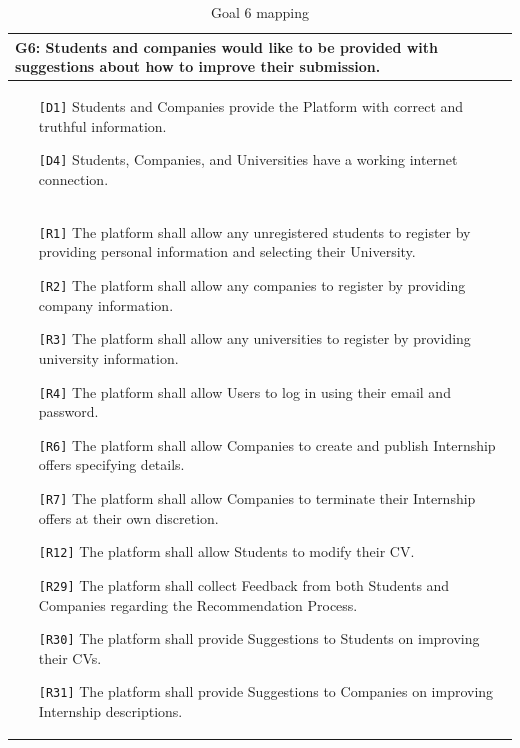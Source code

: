 \begin{table}[H]
    \centering
    \begin{tabular}{|p{15cm}|}
        \hline
        \textbf{G6:} Students and companies would like to be provided with suggestions about how to improve their submission. \\ \hline
        \begin{itemize}
            \item[\texttt{[D1]}] Students and Companies provide the Platform with correct and truthful information.
            \item[\texttt{[D4]}] Students, Companies, and Universities have a working internet connection.
        \end{itemize} \\ \hline
        \begin{itemize}
            \item[\texttt{[R1]}] The platform shall allow any unregistered students to register by providing personal information and selecting their University.
            \item[\texttt{[R2]}] The platform shall allow any companies to register by providing company information.
            \item[\texttt{[R3]}] The platform shall allow any universities to register by providing university information.
            \item[\texttt{[R4]}] The platform shall allow Users to log in using their email and password.
            \item[\texttt{[R6]}] The platform shall allow Companies to create and publish Internship offers specifying details.
            \item[\texttt{[R7]}] The platform shall allow Companies to terminate their Internship offers at their own discretion.
            \item[\texttt{[R12]}] The platform shall allow Students to modify their CV.
            \item[\texttt{[R29]}] The platform shall collect Feedback from both Students and Companies regarding the Recommendation Process.
            \item[\texttt{[R30]}] The platform shall provide Suggestions to Students on improving their CVs.
            \item[\texttt{[R31]}] The platform shall provide Suggestions to Companies on improving Internship descriptions.
        \end{itemize} \\ \hline
    \end{tabular}
    \caption{Goal 6 mapping}
    \label{tab:G6}
\end{table}

